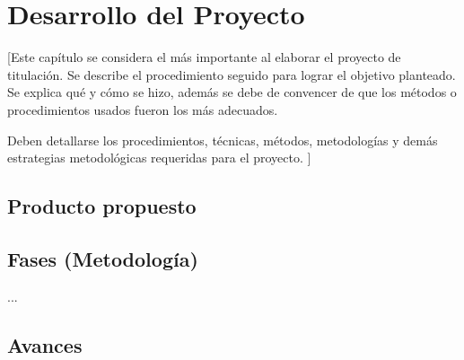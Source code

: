 \chapter{Desarrollo del Proyecto}
[Este capítulo se considera el más importante al elaborar el proyecto de titulación. Se describe el procedimiento seguido para lograr el objetivo planteado. Se explica qué y cómo se hizo, además se debe de convencer de que los métodos o procedimientos usados fueron los más adecuados.

Deben detallarse los procedimientos, técnicas, métodos, metodologías y demás estrategias metodológicas requeridas para el proyecto. 
]

\section{Producto propuesto}

\section{Fases (Metodología)}



...
\section{Avances}


